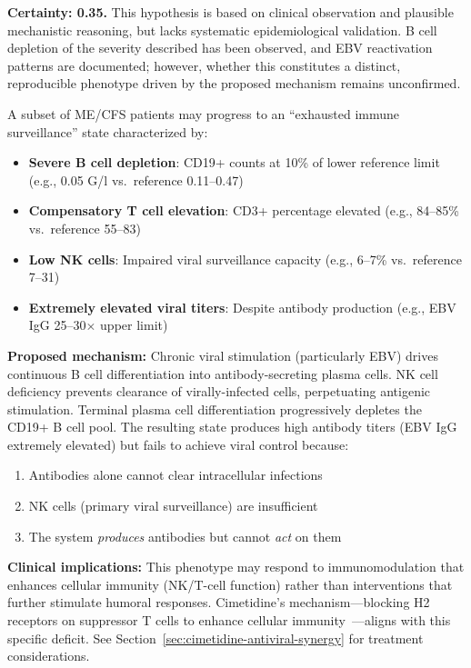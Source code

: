 \begin{speculation}
\label{spec:exhausted-surveillance}

\textbf{Certainty: 0.35.} This hypothesis is based on clinical observation and plausible mechanistic reasoning, but lacks systematic epidemiological validation. B cell depletion of the severity described has been observed, and EBV reactivation patterns are documented; however, whether this constitutes a distinct, reproducible phenotype driven by the proposed mechanism remains unconfirmed.

A subset of ME/CFS patients may progress to an ``exhausted immune surveillance'' state characterized by:
\begin{itemize}
    \item \textbf{Severe B cell depletion}: CD19+ counts at 10\% of lower reference limit (e.g., 0.05 G/l vs.\ reference 0.11--0.47)
    \item \textbf{Compensatory T cell elevation}: CD3+ percentage elevated (e.g., 84--85\% vs.\ reference 55--83)
    \item \textbf{Low NK cells}: Impaired viral surveillance capacity (e.g., 6--7\% vs.\ reference 7--31)
    \item \textbf{Extremely elevated viral titers}: Despite antibody production (e.g., EBV IgG 25--30$\times$ upper limit)
\end{itemize}

\textbf{Proposed mechanism:}
Chronic viral stimulation (particularly EBV) drives continuous B cell differentiation into antibody-secreting plasma cells. NK cell deficiency prevents clearance of virally-infected cells, perpetuating antigenic stimulation. Terminal plasma cell differentiation progressively depletes the CD19+ B cell pool. The resulting state produces high antibody titers (EBV IgG extremely elevated) but fails to achieve viral control because:
\begin{enumerate}
    \item Antibodies alone cannot clear intracellular infections
    \item NK cells (primary viral surveillance) are insufficient
    \item The system \textit{produces} antibodies but cannot \textit{act} on them
\end{enumerate}

\textbf{Clinical implications:}
This phenotype may respond to immunomodulation that enhances cellular immunity (NK/T-cell function) rather than interventions that further stimulate humoral responses. Cimetidine's mechanism---blocking H2 receptors on suppressor T cells to enhance cellular immunity~\cite{Goldstein1986CimetidineEBV}---aligns with this specific deficit. See Section~\ref{sec:cimetidine-antiviral-synergy} for treatment considerations.


\end{speculation}
